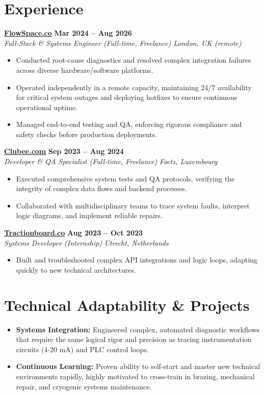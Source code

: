 \documentclass[a4paper,10pt]{article}
\newcommand{\role}[4]{%
 \textbf{#1} \hfill \textbf{#2}\\[1pt]%
 \textit{#3} \hfill \textit{#4}\\[2pt]%
}
\begin{document}
\section{Experience}

\role{\href{https://flowspace.co}{FlowSpace.co}}{Mar 2024 -- Aug 2026}{Full-Stack \& Systems Engineer (Full-time, Freelance)}{London, UK (remote)}
\begin{itemize}
 \item Conducted root-cause diagnostics and resolved complex integration failures across diverse hardware/software platforms.
 \item Operated independently in a remote capacity, maintaining 24/7 availability for critical system outages and deploying hotfixes to ensure continuous operational uptime.
 \item Managed end-to-end testing and QA, enforcing rigorous compliance and safety checks before production deployments.
\end{itemize}

\role{\href{https://clubee.com}{Clubee.com}}{Sep 2023 -- Aug 2024}{Developer \& QA Specialist (Full-time, Freelance)}{Foetz, Luxembourg}
\begin{itemize}
 \item Executed comprehensive system tests and QA protocols, verifying the integrity of complex data flows and backend processes.
 \item Collaborated with multidisciplinary teams to trace system faults, interpret logic diagrams, and implement reliable repairs.
\end{itemize}

\role{\href{https://tractionboard.co}{Tractionboard.co}}{Aug 2023 -- Oct 2023}{Systems Developer (Internship)}{Utrecht, Netherlands}
\begin{itemize}
 \item Built and troubleshooted complex API integrations and logic loops, adapting quickly to new technical architectures.
\end{itemize}

\section{Technical Adaptability \& Projects}
\begin{itemize}
 \item \textbf{Systems Integration:} Engineered complex, automated diagnostic workflows that require the same logical rigor and precision as tracing instrumentation circuits (4-20 mA) and PLC control loops.
 \item \textbf{Continuous Learning:} Proven ability to self-start and master new technical environments rapidly, highly motivated to cross-train in brazing, mechanical repair, and cryogenic systems maintenance.
\end{itemize}
\end{document}
